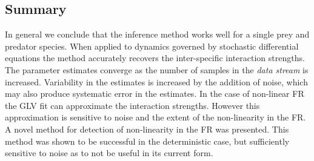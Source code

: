 

\subsection{Summary}
\label{sec:res_ODE_summary}

In general we conclude that the inference method works well for a single prey and predator species. When applied to dynamics governed by stochastic differential equations the method accurately recovers the inter-specific interaction strengths. The parameter estimates converge as the number of samples in the \emph{data stream} is increased. Variability in the estimates is increased by the addition of noise, which may also produce systematic error in the estimates. In the case of non-linear FR the GLV fit can approximate the interaction strengths. However this approximation is sensitive to noise and the extent of the non-linearity in the FR. A novel method for detection of non-linearity in the FR was presented. This method was shown to be successful in the deterministic case, but sufficiently sensitive to noise as to not be useful in its current form.


%
%
%

